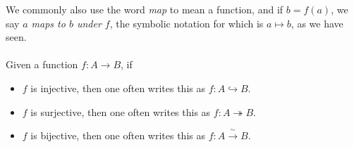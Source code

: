 \vspace*{1em}

\begin{remark}
We commonly also use the word \emph{map} to mean a function, and if $b = f(a)$, we say \emph{$a$ maps to $b$ under $f$}, the symbolic notation for which is $a\mapsto b$, as we have seen.\\
\\
Given a function $f:A \to B$, if
\begin{itemize}
\item $f$ is injective, then one often writes this as $f:A \hookrightarrow B$.
\item $f$ is surjective, then one often writes this as $f:A\twoheadrightarrow B$.
\item $f$ is bijective, then one often writes this as $f: A \overset{\!\!\sim}{\to} B$.
\end{itemize}
\end{remark}